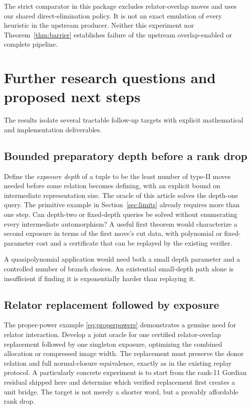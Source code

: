 \documentclass[11pt,letterpaper]{article}
\theoremstyle{definition}\newtheorem{definition}[theorem]{Definition}
\begin{document}
The strict comparator in this package excludes relator-overlap moves and uses our shared direct-elimination policy. It is not an exact emulation of every heuristic in the upstream producer. Neither this experiment nor Theorem~\ref{thm:barrier} establishes failure of the upstream overlap-enabled or complete pipeline.

\section{Further research questions and proposed next steps}\label{sec:questions}
The results isolate several tractable follow-up targets with explicit mathematical and implementation deliverables.

\subsection{Bounded preparatory depth before a rank drop}
Define the \emph{exposure depth} of a tuple to be the least number of type-II moves needed before some relation becomes defining, with an explicit bound on intermediate representation size. The oracle of this article solves the depth-one query. The primitive example in Section~\ref{sec:limits} already requires more than one step. Can depth-two or fixed-depth queries be solved without enumerating every intermediate automorphism? A useful first theorem would characterize a second exposure in terms of the first move's cut data, with polynomial or fixed-parameter cost and a certificate that can be replayed by the existing verifier.

A quasipolynomial application would need both a small depth parameter and a controlled number of branch choices. An existential small-depth path alone is insufficient if finding it is exponentially harder than replaying it.

\subsection{Relator replacement followed by exposure}
The proper-power example \eqref{eq:properpowers} demonstrates a genuine need for relator interaction. Develop a joint oracle for one certified relator-overlap replacement followed by one singleton exposure, optimizing the combined allocation or compressed image width. The replacement must preserve the donor relation and full normal-closure equivalence, exactly as in the existing replay protocol. A particularly concrete experiment is to start from the rank-11 Gordian residual shipped here and determine which verified replacement first creates a unit bridge. The target is not merely a shorter word, but a provably affordable rank drop.
\end{document}
